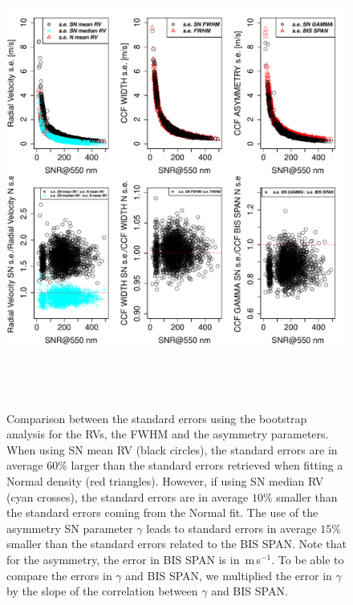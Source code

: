 \documentclass{aa}
\def\ms{\hbox{\,m\,s$^{-1}$}}         %
\begin{document}
\begin{figure}[htbp]
\begin{center}
\includegraphics[height = 6in]{[5]Errors_vs_SNR_all_stars.pdf} 
   \caption{Comparison between the standard errors using the bootstrap analysis for the RVs, the FWHM and the asymmetry parameters. When using SN mean RV (black circles), the standard errors are in average $60\%$ larger than the standard errors retrieved when fitting a Normal density (red triangles). However, if using SN median RV (cyan crosses), the standard errors are in average $10\%$ smaller than the standard errors coming from the Normal fit. The use of the asymmetry SN parameter $\gamma$ leads to standard errors in average $15\%$ smaller than the standard errors related to the BIS SPAN. Note that for the asymmetry, the error in BIS SPAN is in \ms. To be able to compare the errors in $\gamma$ and BIS SPAN, we multiplied the error in $\gamma$ by the slope of the correlation between $\gamma$ and BIS SPAN.}
   \label{fig:se}
\end{center}
\end{figure}
\end{document}
